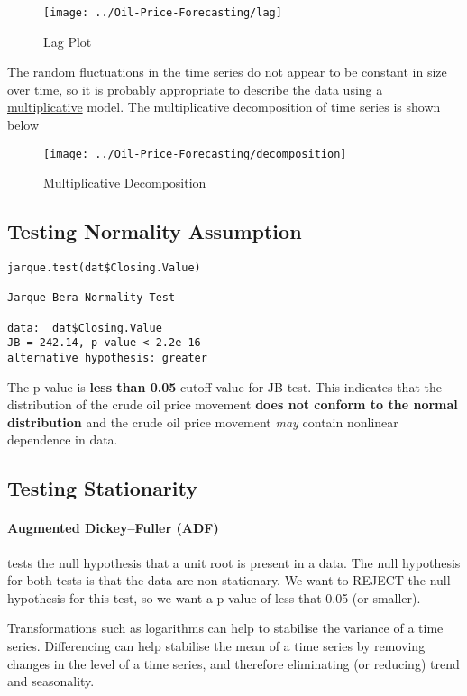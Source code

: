 \documentclass[11pt,a4paper]{article}
\begin{document}
\begin{figure}[h!]
	\centering
	\texttt{[image: ../Oil-Price-Forecasting/lag]}
	\caption{Lag Plot}
	\label{fig:lag}
\end{figure}

The random fluctuations in the time series do not appear to be constant in size over time, so it is probably appropriate to describe the data using a \underline{multiplicative} model. The multiplicative decomposition of time series is shown below
\begin{figure}
	\centering
	\texttt{[image: ../Oil-Price-Forecasting/decomposition]}
	\caption{Multiplicative Decomposition}
	\label{fig:decomposition}
\end{figure}

\subsection{Testing Normality Assumption}
\begin{lstlisting}
jarque.test(dat$Closing.Value)

Jarque-Bera Normality Test

data:  dat$Closing.Value
JB = 242.14, p-value < 2.2e-16
alternative hypothesis: greater

\end{lstlisting}
The p-value is \textbf{less than 0.05} cutoff value for JB test. This indicates that the distribution of the crude oil price movement \textbf{does not conform to the normal distribution} and the crude oil price movement \textit{may} contain nonlinear dependence in data.

\subsection{Testing Stationarity}
\paragraph{Augmented Dickey–Fuller (ADF)} tests the null hypothesis that a unit root is present in a data. 
The null hypothesis for both tests is that the data are non-stationary. We want to REJECT the null hypothesis for this test, so we want a p-value of less that 0.05 (or smaller).

Transformations such as logarithms can help to stabilise the variance of a time series. Differencing can help stabilise the mean of a time series by removing changes in the level of a time series, and therefore eliminating (or reducing) trend and seasonality.
\end{document}
